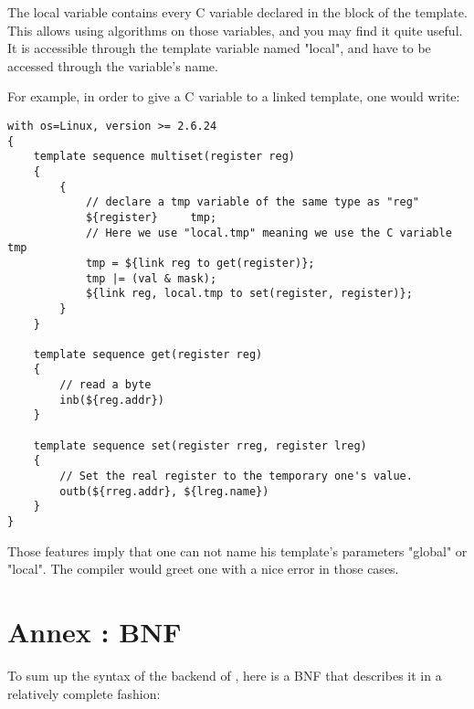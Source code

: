 \documentclass[american]{rtxreport}
\begin{document}
The local variable contains every C variable declared in the block of the
template. This allows using algorithms on those variables, and you may find it
quite useful. It is accessible through the template variable named "local", and
have to be accessed through the variable's name.

For example, in order to give a C variable to a linked template, one would
write:
\begin{lstlisting}
with os=Linux, version >= 2.6.24
{
    template sequence multiset(register reg)
    {
        {
            // declare a tmp variable of the same type as "reg"
            ${register}     tmp;
            // Here we use "local.tmp" meaning we use the C variable tmp
            tmp = ${link reg to get(register)};
            tmp |= (val & mask);
            ${link reg, local.tmp to set(register, register)};
        }
    }

    template sequence get(register reg)
    {
        // read a byte
        inb(${reg.addr})
    }

    template sequence set(register rreg, register lreg)
    {
        // Set the real register to the temporary one's value.
        outb(${rreg.addr}, ${lreg.name})
    }
}
\end{lstlisting}

Those features imply that one can not name his template's parameters "global"
or "local". The compiler would greet one with a nice error in those cases.


\section{Annex : BNF}

To sum up the syntax of the backend of \rtx, here is a BNF that describes it
in a relatively complete fashion:
\end{document}
